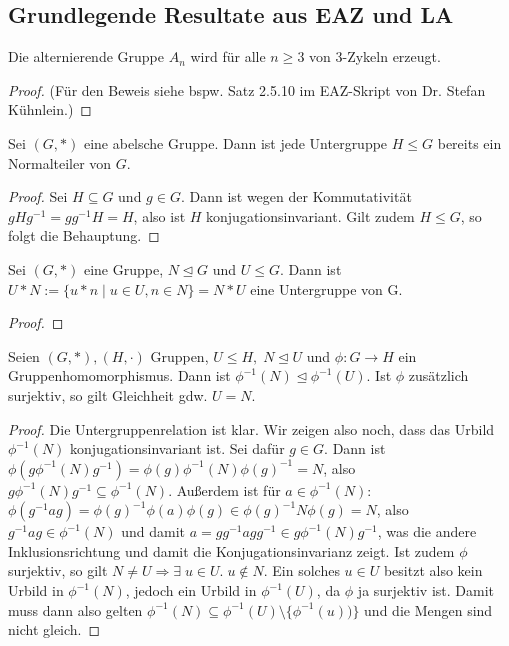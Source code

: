 \documentclass[../main.tex]{subfiles}
\begin{document}
\subsection{Grundlegende Resultate aus EAZ und LA}

\begin{lemma}\label{lem:found:0}
    \TODO
\end{lemma}

\begin{lemma}\label{lem:found:1}
Die alternierende Gruppe $A_n$ wird für alle $n \geq 3$ von 3-Zykeln erzeugt.
\end{lemma}
    \begin{proof}
        \TODO (Für den Beweis siehe bspw. Satz 2.5.10 im EAZ-Skript von Dr. Stefan Kühnlein.)
    \end{proof}
    
\begin{lemma}\label{lem:found:2}
Sei $(G,*)$ eine abelsche Gruppe. Dann ist jede Untergruppe $H \leq G$ bereits ein Normalteiler von $G$.
\end{lemma}
\begin{proof}
    Sei $H \subseteq G$ und $g \in G$. Dann ist wegen der Kommutativität $gHg^{-1} = gg^{-1}H = H$, also ist $H$ konjugationsinvariant. Gilt zudem $H \leq G$, so folgt die Behauptung.
\end{proof}
    
\begin{lemma}\label{lem:found:3}
    Sei $(G,*)$ eine Gruppe, $N \trianglelefteq G$ und $U \leq G$. Dann ist $U*N := \{u*n \mid u \in U, n \in N\} = N*U$ eine Untergruppe von G.
\end{lemma}
\begin{proof}
    \TODO
\end{proof}
    
\begin{lemma}\label{lem:found:4}
    Seien $(G,*), (H,\cdot)$ Gruppen, $U \leq H, \; N \trianglelefteq U$ und $\phi: G \rightarrow H$ ein Gruppenhomomorphismus. Dann ist $\phi^{-1}(N) \trianglelefteq \phi^{-1}(U)$. Ist $\phi$ zusätzlich surjektiv, so gilt Gleichheit gdw. $U = N$.
\end{lemma}
\begin{proof} 
    Die Untergruppenrelation ist klar. Wir zeigen also noch, dass das Urbild $\phi^{-1}(N)$ konjugationsinvariant ist. Sei dafür $g \in G$. Dann ist $\phi(g\phi^{-1}(N)g^{-1}) = \phi(g)\phi^{-1}(N)\phi(g)^{-1} = N$, also $g\phi^{-1}(N)g^{-1} \subseteq \phi^{-1}(N)$. Außerdem ist für $a \in \phi^{-1}(N)$: $\phi(g^{-1}ag) = \phi(g)^{-1}\phi(a)\phi(g) \in \phi(g)^{-1}N\phi(g) = N$, also $g^{-1}ag \in \phi^{-1}(N)$ und damit $a = gg^{-1}agg^{-1} \in g\phi^{-1}(N)g^{-1}$, was die andere Inklusionsrichtung und damit die Konjugationsinvarianz zeigt.
    Ist zudem $\phi$ surjektiv, so gilt $N \neq U \Rightarrow \exists \; u \in U. \; u \notin N$. Ein solches $u \in U$ besitzt also kein Urbild in $\phi^{-1}(N)$, jedoch ein Urbild in $\phi^{-1}(U)$, da $\phi$ ja surjektiv ist. Damit muss dann also gelten $\phi^{-1}(N) \subseteq \phi^{-1}(U)\setminus\{\phi^{-1}(u))\}$ und die Mengen sind nicht gleich.
\end{proof}
    
\end{document}
